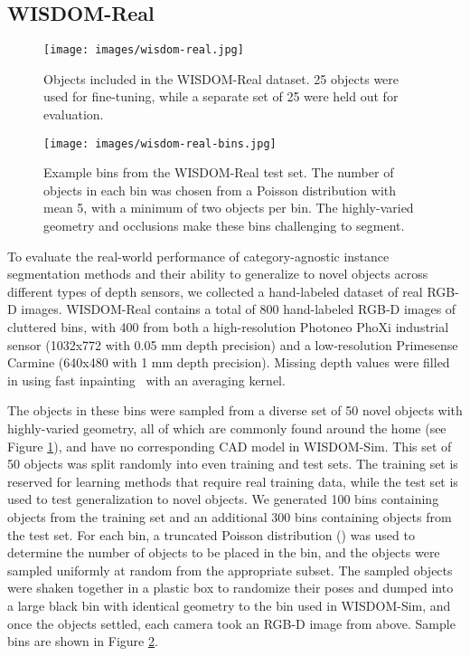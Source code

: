 \documentclass[letterpaper, 10 pt, conference]{ieeeconf}  \pdfoutput=1
\numberwithin{equation}{section}
\begin{document}
\subsection{WISDOM-Real} 

\begin{figure}[h]
    \centering
    \texttt{[image: images/wisdom-real.jpg]}
    \caption{Objects included in the WISDOM-Real dataset. 25 objects were used for fine-tuning, while a separate set of 25 were held out for evaluation.}
  \label{fig:real_dataset} 
\end{figure}

\begin{figure}[h]
    \centering
    \texttt{[image: images/wisdom-real-bins.jpg]}
    \caption{Example bins from the WISDOM-Real test set. The number of objects in each bin was chosen from a Poisson distribution with mean 5, with a minimum of two objects per bin. The highly-varied geometry and occlusions make these bins challenging to segment.}
  \label{fig:real_bins} 
\end{figure}

To evaluate the real-world performance of category-agnostic instance segmentation methods and their ability to generalize to novel objects across different types of depth sensors, we collected a hand-labeled dataset of real RGB-D images.
WISDOM-Real contains a total of 800 hand-labeled RGB-D images of cluttered bins, with 400 from both a high-resolution Photoneo PhoXi industrial sensor (1032x772 with 0.05 mm depth precision) and a low-resolution Primesense Carmine (640x480 with 1 mm depth precision). 
Missing depth values were filled in using fast inpainting~\cite{richard2001fast} with an averaging kernel.

The objects in these bins were sampled from a diverse set of 50 novel objects with highly-varied geometry, all of which are commonly found around the home (see Figure \ref{fig:real_dataset}), and have no corresponding CAD model in WISDOM-Sim.
This set of 50 objects was split randomly into even training and test sets.
The training set is reserved for learning methods that require real training data, while the test set is used to test generalization to novel objects.
We generated 100 bins containing objects from the training set and an additional 300 bins containing objects from the test set.
For each bin, a truncated Poisson distribution () was used to determine the number of objects to be placed in the bin, and the objects were sampled uniformly at random from the appropriate subset.
The sampled objects were shaken together in a plastic box to randomize their poses and dumped into a large black bin with identical geometry to the bin used in WISDOM-Sim, and once the objects settled, each camera took an RGB-D image from above.
Sample bins are shown in Figure \ref{fig:real_bins}.
\end{document}
